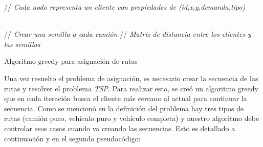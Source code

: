 \documentclass[letter, 10pt]{article}
\newcommand{\commentsymbol}{//}%
\newcommand{\LineComment}[2][\algorithmicindent]{\Statex \hspace{#1}\commentsymbol{} #2}
\begin{document}
\begin{algorithm}[H]
\begin{algorithmic}
    \LineComment[0\dimexpr\algorithmicindent]{\textit{Cada nodo representa un cliente con propiedades de (id,x,y,demanda,tipo)}}
    
    \\
    \LineComment[0\dimexpr\algorithmicindent]{\textit{Crear una semilla a cada camión}}
    \ENDFOR
    \LineComment[0\dimexpr\algorithmicindent]{\textit{Matriz de distancia entre los clientes y las semillas}}
    
    \ELSE
    \ENDIF
    \ENDFOR
    \caption{Algoritmo greedy para asignación de rutas}
\end{algorithmic}
\end{algorithm}
Una vez resuelto el problema de asignación, es necesario crear la secuencia de las rutas y resolver el problema \textit{TSP}. Para realizar esto, se creó un algoritmo greedy que en cada iteración busca el cliente más cercano al actual para continuar la secuencia. Como se mencionó en la definición del problema hay tres tipos de rutas (camión puro, vehículo puro y vehículo completa) y nuestro algoritmo debe controlar esos casos cuando va creando las secuencias. Esto es detallado a continuación y en el segundo pseudocódigo:
\end{document}
